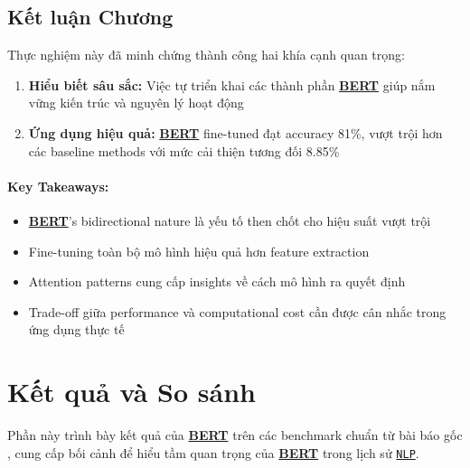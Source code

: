     \subsection{Kết luận Chương}
    \label{ssec:ket_luan_chuong}
    
    Thực nghiệm này đã minh chứng thành công hai khía cạnh quan trọng:
    
    \begin{enumerate}
        \item \textbf{Hiểu biết sâu sắc:} Việc tự triển khai các thành phần \hyperref[acro:bert]{\textbf{BERT}} giúp nắm vững kiến trúc và
        nguyên lý hoạt động
        \item \textbf{Ứng dụng hiệu quả:} \hyperref[acro:bert]{\textbf{BERT}} fine-tuned đạt accuracy 81\%, vượt trội hơn các baseline methods với mức cải thiện tương đối 8.85\%
    \end{enumerate}
    
    \paragraph{Key Takeaways:}
    \begin{itemize}
        \item \hyperref[acro:bert]{\textbf{BERT}}'s bidirectional nature là yếu tố then chốt cho hiệu suất vượt trội
        \item Fine-tuning toàn bộ mô hình hiệu quả hơn feature extraction
        \item Attention patterns cung cấp insights về cách mô hình ra quyết định
        \item Trade-off giữa performance và computational cost cần được cân nhắc trong ứng dụng thực tế
    \end{itemize}
    
    \section{Kết quả và So sánh}
    \label{sec:ket_qua_so_sanh}
    
    Phần này trình bày kết quả của \hyperref[acro:bert]{\textbf{BERT}} trên các benchmark chuẩn từ bài báo gốc \cite{devlin2018bert}, cung cấp bối cảnh để hiểu tầm quan trọng của \hyperref[acro:bert]{\textbf{BERT}} trong lịch sử \hyperref[acro:nlp]{\texttt{NLP}}.
    
